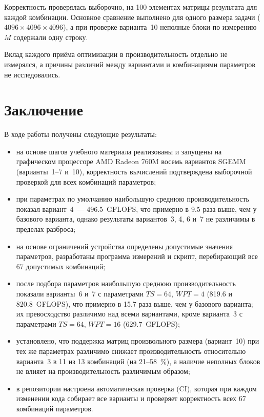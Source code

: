 \documentclass[a4paper]{article}
\begin{document}
Корректность проверялась выборочно, на 100 элементах матрицы результата
для каждой комбинации. Основное сравнение выполнено для одного размера
задачи ($4096 \times 4096 \times 4096$), а при проверке варианта~10
неполные блоки по измерению $M$ содержали одну строку.

Вклад каждого приёма оптимизации в производительность отдельно не
измерялся, а причины различий между вариантами и комбинациями
параметров не исследовались.

\section{Заключение}

В ходе работы получены следующие результаты:
\begin{itemize}
    \item на основе шагов учебного материала реализованы и запущены на
    графическом процессоре AMD Radeon 760M восемь вариантов SGEMM
    (варианты~1--7 и~10), корректность вычислений подтверждена
    выборочной проверкой для всех комбинаций параметров;
    \item при параметрах по умолчанию наибольшую среднюю
    производительность показал вариант~4~--- 496.5~GFLOPS, что
    примерно в 9.5 раза выше, чем у базового варианта, однако
    результаты вариантов~3, 4, 6 и~7 не различимы в пределах разброса;
    \item на основе ограничений устройства определены допустимые
    значения параметров, разработаны программа измерений и скрипт,
    перебирающий все 67 допустимых комбинаций;
    \item после подбора параметров наибольшую среднюю
    производительность показали варианты~6 и~7 с параметрами $TS=64$,
    $WPT=4$ (819.6 и 820.8~GFLOPS), что примерно в 15.7 раза выше,
    чем у базового варианта; их превосходство различимо над всеми
    вариантами, кроме варианта~3 с параметрами $TS=64$, $WPT=16$
    (629.7~GFLOPS);
    \item установлено, что поддержка матриц произвольного размера
    (вариант~10) при тех же параметрах различимо снижает
    производительность относительно варианта~3 в 11 из 13 комбинаций
    (на 21--58~\%), а наличие неполных блоков не влияет на
    производительность различимым образом;
    \item в репозитории настроена автоматическая проверка (CI), которая
    при каждом изменении кода собирает все варианты и проверяет
    корректность всех 67 комбинаций параметров.
\end{itemize}
\end{document}
